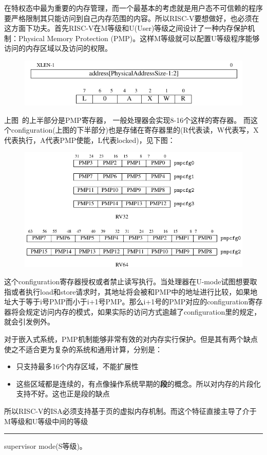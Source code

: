 \documentclass{article}
\newcommand{\chinesedash}{\rule[.7ex]{\widthof{二字}}{0.5pt}}
\begin{document}
\begin{enumerate}
	在特权态中最为重要的内存管理，而一个最基本的考虑就是用户态不可信赖的程序要严格限制其只能访问到自己内存范围的内容。所以RISC-V要想做好，也必须在这方面下功夫。首先RISC-V在M等级和U(User)等级之间设计了一种内存保护机制：Physical Memory Protection (PMP)。这样M等级就可以配置U等级程序能够访问的内存区域以及访问的权限。
	\begin{figure}[H]
		\centering
		\includegraphics[width=0.7\linewidth]{figs/PMP1.png}
		\end{figure}
	上图~\cite{privileged}的上半部分是PMP寄存器， 一般处理器会实现8-16个这样的寄存器。
	而这个configuration(上图的下半部分)也是存储在寄存器里的(R代表读，W代表写，X代表执行，A代表PMP使能，L代表locked)，见下图：~\cite{privileged}
	\begin{figure}[H]
		\centering
		\includegraphics[width=0.7\linewidth]{figs/config.png}
	\end{figure}
	这个configuration寄存器授权或者禁止读写执行。当处理器在U-mode试图想要取指或者执行load和store请求时，其地址将会被和PMP中的地址进行比较，如果地址大于等于i号PMP而小于i+1号PMP。那么i+1号的PMP对应的configuration寄存器将会规定访问内存的模式，如果实际的访问方式逾越了configuration里的规定，就会引发例外。~\cite{privileged}
	
	对于嵌入式系统，PMP机制能够非常有效的对内存实行保护。但是其有两个缺点使之不适合更为复杂的系统和通用计算，分别是：
	\begin{itemize}
		\item 只支持最多16个内存区域，不能扩展性
		\item 这些区域都是连续的，有点像操作系统早期的\textbf{段}的概念。所以对内存的片段化支持不好。这也正是段的缺点
	\end{itemize}
	所以RISC-V的ISA必须支持基于页的虚拟内存机制。而这个特征直接主导了介于M等级和U等级中间的等级\chinesedash supervisor mode(S等级)。
	

\end{enumerate}
\end{document}
